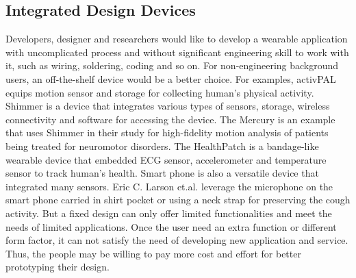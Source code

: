 \subsection{Integrated Design Devices}
Developers, designer and researchers would like to develop a wearable application with uncomplicated process and without significant engineering skill to work with it, such as wiring, soldering, coding and so on. For non-engineering background users, an off-the-shelf device would be a better choice. For examples, activPAL \cite{activPAL} equips motion sensor and storage for collecting human's physical activity. Shimmer \cite{Shimmer} is a device that integrates various types of sensors, storage, wireless connectivity and software for accessing the device. The Mercury \cite{Lorincz:2009:MWS:1644038.1644057} is an example that uses Shimmer in their study for high-fidelity motion analysis of patients being treated for neuromotor disorders. The HealthPatch \cite{vitalconnect} is a bandage-like wearable device that embedded ECG sensor, accelerometer and temperature sensor to track human's health.
Smart phone is also a versatile device that integrated many sensors. 
Eric C. Larson et.al. \cite{Larson:2011:APP:2030112.2030163} leverage the microphone on the smart phone carried in shirt pocket or using a neck strap for preserving the cough activity.
But a fixed design can only offer limited functionalities and meet the needs of limited applications. Once the user need an extra function or different form factor, it can not satisfy the need of developing new application and service. Thus, the people may be willing to pay more cost and effort for better prototyping their design.


